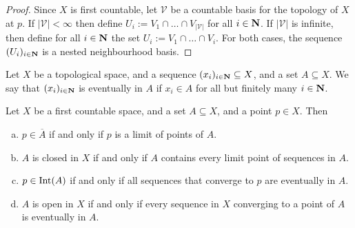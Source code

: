\begin{proof}
  Since \(X\) is first countable, let \(\mathcal V\) be a countable basis for the
  topology of \(X\) at \(p\). If \(|\mathcal V| < \infty\) then define \(U_i :=
  V_1 \cap \dots \cap V_{|\mathcal V|}\) for all \(i \in \mathbf{N}\). If
  \(|\mathcal V|\) is infinite, then define for all \(i \in \mathbf{N}\) the
  set \(U_i := V_1 \cap \dots \cap V_i\). For both cases, the sequence
  \((U_i)_{i \in \mathbf{N}}\) is a nested neighbourhood basis.
\end{proof}

\begin{definition}[Eventually in]
  Let \(X\) be a topological space, and a sequence \((x_i)_{i \in \mathbf{N}}
  \subseteq X\), and a set \(A \subseteq X\). We say that \((x_i)_{i \in
  \mathbf{N}}\) is eventually in \(A\) if \(x_i \in A\) for all but finitely
  many \(i \in \mathbf{N}\).
\end{definition}

\begin{lemma}\label{lem: sequence lemma}
  Let \(X\) be a first countable space, and a set \(A \subseteq X\), and a point
  \(p \in X\). Then
  \begin{enumerate}[(a)]
    \item \(p \in \overline A\) if and only if \(p\) is a limit of points of
      \(A\).
    \item \(A\) is closed in \(X\) if and only if \(A\) contains every limit
      point of sequences in \(A\).
    \item \(p \in \operatorname{Int}(A)\) if and only if all sequences that converge to
      \(p\) are eventually in \(A\).
    \item \(A\) is open in \(X\) if and only if every sequence in \(X\)
      converging to a point of \(A\) is eventually in \(A\).
  \end{enumerate}
\end{lemma}

